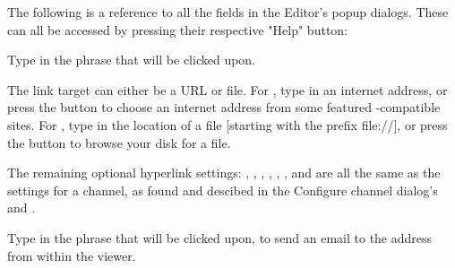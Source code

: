 The following is a reference to all the fields in the Editor's popup dialogs. 
These can all be accessed by pressing their respective "Help" button:


 Type in the phrase that will be clicked upon.  

The link target can either be a URL or file. For , 
type in an internet address, or press the  
button to choose an internet address from some featured \brandingapplicationsuitename-compatible 
sites. For , type in the location of a file
[starting with the prefix file://], or press the 
 button to browse your disk for a file.

The remaining optional hyperlink settings: 
, 
, 
, 
,
,
, and 
are all the same as the settings for a channel, as found and descibed in the 
Configure channel dialog's 
\helpignore{\ref{sec:pd-channel-dialog-spidering-tab}}
and 
\helpignore{\ref{sec:pd-channel-dialog-images-tab}}
.


 Type in the phrase that will be 
  clicked upon, to send an email to the address from within the \brandingapplicationsuitename viewer.  

